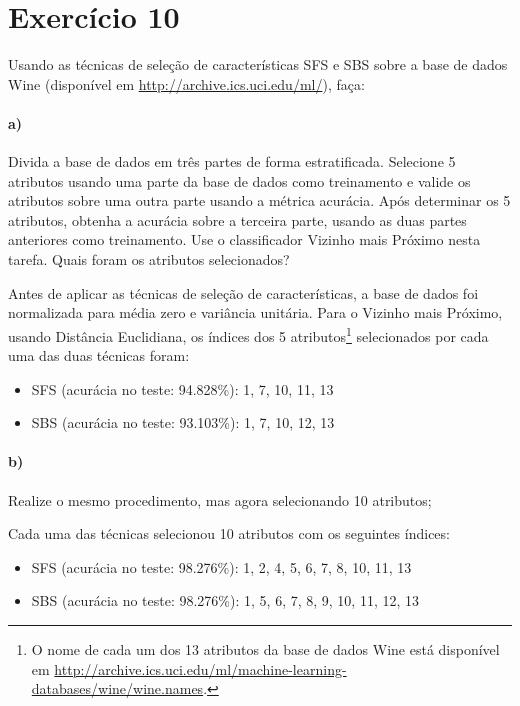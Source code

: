 \documentclass{article}
\begin{document}
\section{Exercício 10}

Usando as técnicas de seleção de características SFS e SBS sobre a base de dados Wine (disponível em \url{http://archive.ics.uci.edu/ml/}), faça:

\paragraph{a)} Divida a base de dados em três partes de forma estratificada. Selecione 5 atributos usando uma parte da base de dados como treinamento e valide os atributos sobre uma outra parte usando a métrica acurácia. Após determinar os 5 atributos, obtenha a acurácia sobre a terceira parte, usando as duas partes anteriores como treinamento. Use o classificador Vizinho mais Próximo nesta tarefa. Quais foram os atributos selecionados?

Antes de aplicar as técnicas de seleção de características, a base de dados foi normalizada para média zero e variância unitária. Para o Vizinho mais Próximo, usando Distância Euclidiana, os índices dos 5 atributos\footnote{O nome de cada um dos 13 atributos da base de dados Wine está disponível em \url{http://archive.ics.uci.edu/ml/machine-learning-databases/wine/wine.names}.} selecionados por cada uma das duas técnicas foram:

\begin{itemize}
	\item SFS (acurácia no teste: 94.828\%): 1, 7, 10, 11, 13
	\item SBS (acurácia no teste: 93.103\%): 1, 7, 10, 12, 13
\end{itemize}

\paragraph{b)} Realize o mesmo procedimento, mas agora selecionando 10 atributos;

Cada uma das técnicas selecionou 10 atributos com os seguintes índices:

\begin{itemize}
	\item SFS (acurácia no teste: 98.276\%): 1, 2, 4, 5, 6, 7, 8, 10, 11, 13
	\item SBS (acurácia no teste: 98.276\%): 1, 5, 6, 7, 8, 9, 10, 11, 12, 13
\end{itemize}
\end{document}
